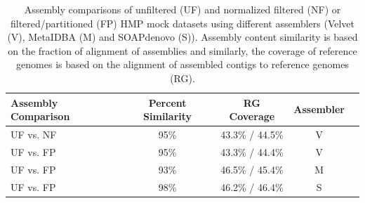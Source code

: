 \documentclass{pnastwo}
\begin{document}



%


\begin{table}
\caption{Assembly comparisons of unfiltered (UF) and normalized filtered (NF) or
  filtered/partitioned (FP) HMP mock datasets using different
  assemblers (Velvet (V), MetaIDBA (M) and SOAPdenovo (S)).  Assembly
  content similarity is based on the fraction of alignment of
  assemblies and similarly, the coverage of reference genomes is based
  on the alignment of assembled contigs to reference genomes (RG).}
\begin{tabular}{@{\extracolsep{\fill}}lcccc}
Assembly Comparison & Percent Similarity & RG Coverage & Assembler \\
\hline
UF vs. NF & 95\% & 43.3\% / 44.5\% & V \\
UF vs. FP & 95\% & 43.3\% / 44.4\% & V\\
UF vs. FP & 93\% & 46.5\% / 45.4\% & M\\ 
UF vs. FP & 98\% &  46.2\% / 46.4\% & S\\
\hline
\end{tabular}
\label{assembly-compare}
\end{table}
\end{document}
